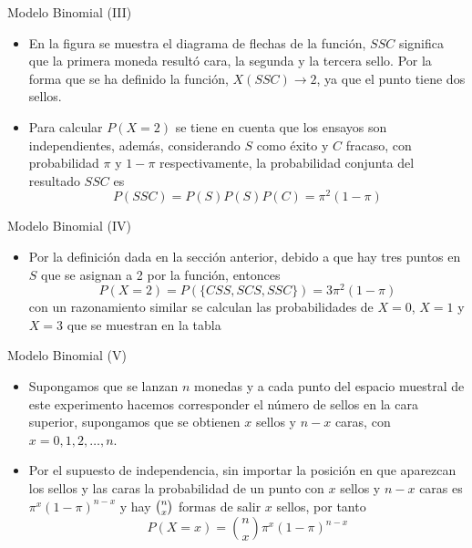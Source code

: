 \documentclass[
  ignorenonframetext,
  aspectratio=169,
  spanish,
]{beamer}
\providecommand{\tightlist}{%
  \setlength{\itemsep}{0pt}\setlength{\parskip}{0pt}}
\begin{document}
\begin{frame}{Modelo Binomial (III)}
\label{modelo-binomial-iii-1}
\begin{itemize}
\item
  En la figura se muestra el diagrama de flechas de la función, \(SSC\)
  significa que la primera moneda resultó cara, la segunda y la tercera
  sello. Por la forma que se ha definido la función, \(X(SSC)\to 2\), ya
  que el punto tiene dos sellos.
\item
  Para calcular \(P(X=2)\) se tiene en cuenta que los ensayos son
  independientes, además, considerando \(S\) como éxito y \(C\) fracaso,
  con probabilidad \(\pi\) y \(1-\pi\) respectivamente, la probabilidad
  conjunta del resultado \(SSC\) es \[P(SSC)=P(S)P(S)P(C)=\pi^2(1-\pi)\]
\end{itemize}
\end{frame}

\begin{frame}{Modelo Binomial (IV)}
\label{modelo-binomial-iv}
\begin{itemize}
\tightlist
\item
  Por la definición dada en la sección anterior, debido a que hay tres
  puntos en \(S\) que se asignan a 2 por la función, entonces
  \[P(X=2)=P(\{CSS,SCS,SSC\})=3\pi^2(1-\pi)\] con un razonamiento
  similar se calculan las probabilidades de \(X=0\), \(X=1\) y \(X=3\)
  que se muestran en la tabla
\end{itemize}
\end{frame}

\begin{frame}{Modelo Binomial (V)}
\label{modelo-binomial-v}
\begin{itemize}
\item
  Supongamos que se lanzan \(n\) monedas y a cada punto del espacio
  muestral de este experimento hacemos corresponder el número de sellos
  en la cara superior, supongamos que se obtienen \(x\) sellos y \(n-x\)
  caras, con \(x=0,1,2,\ldots,n\).
\item
  Por el supuesto de independencia, sin importar la posición en que
  aparezcan los sellos y las caras la probabilidad de un punto con \(x\)
  sellos y \(n-x\) caras es \(\pi^x(1-\pi)^{n-x}\) y hay
  \(\tbinom{n}{x}\) formas de salir \(x\) sellos, por tanto
  \[P(X=x)=\binom{n}{x}\pi^x(1-\pi)^{n-x}\]
\end{itemize}
\end{frame}
\end{document}
